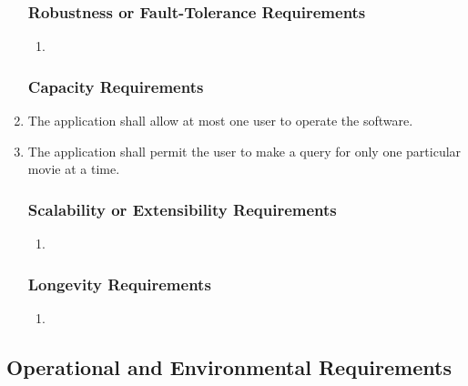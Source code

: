 \documentclass[]{article}
\begin{document}
\begin{enumerate}[{PR}1. ]
\subsubsection{Robustness or Fault-Tolerance Requirements}
\label{ssub:robustness_or_fault_tolerance_requirements}
\begin{enumerate}[{N/A} ]
	\item
\end{enumerate}

\subsubsection{Capacity Requirements}
\label{ssub:capacity_requirements}
	\item The application shall allow at most one user to operate the software.
	\item The application shall permit the user to make a query for only one particular movie at a time.

\subsubsection{Scalability or Extensibility Requirements}
\label{ssub:scalability_or_extensibility_requirements}
\begin{enumerate}[{N/A} ]
	\item
\end{enumerate}


\subsubsection{Longevity Requirements}
\label{ssub:longevity_requirements}
\begin{enumerate}[{N/A} ]
	\item
\end{enumerate}
\end{enumerate}


\subsection{Operational and Environmental Requirements}
\label{sub:operational_and_environmental_requirements}
\end{document}
